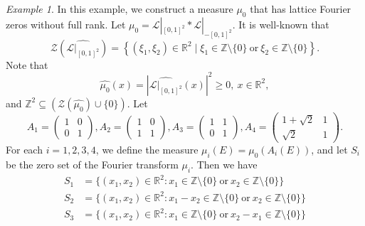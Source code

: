 \documentclass[reqno,a4paper,12pt]{amsart}
\numberwithin{equation}{section}
\newcommand{\Z}{{\mathbb Z}}
\newcounter{rem}
\theoremstyle{remark}
\newtheorem{example}{Example}[section]
\numberwithin{equation}{section}
\def\Z{\mathbb{Z}}
\begin{document}
{%

\begin{example}
 In this example, we construct a measure $\mu_0$ that has lattice Fourier zeros without full rank.    Let $\mu_0=\mathcal{L}|_{[0,1]^2}\ast \mathcal{L}|_{-[0,1]^2}$. It is well-known that 
\[
\mathcal{Z}(\widehat{\mathcal{L}|_{[0,1]^2}})=\left\{(\xi_1,\xi_2)\in\mathbb{R}^2\mid \xi_1\in \mathbb{Z}\setminus\{0\}\ \text{or}\ \xi_2\in \mathbb{Z}\setminus\{0\}\right\}.
\]
Note that \begin{equation}\label{0}
\widehat{\mu_0}(x)=|\widehat{\mathcal{L}|_{[0,1]^2}}(x)|^2\geq0,\ x\in \mathbb{R}^2,
\end{equation}
and $\mathbb{Z}^2\subseteq (\mathcal{Z}(\widehat{\mu_0})\cup\{0\})$.  Let 
\[A_1=\begin{pmatrix}
 1 &0 \\
 0 &1
\end{pmatrix},
A_2=\begin{pmatrix}
 1 &0 \\
 1 &1
\end{pmatrix},A_3=\begin{pmatrix}
 1 &1 \\
 0 &1
\end{pmatrix}
,A_4=\begin{pmatrix}
 1+\sqrt{2} &1 \\
\sqrt{2} &1
\end{pmatrix}.\]
For each $i = 1,2,3,4$, we define the measure $\mu_i(E) = \mu_0 (A_i (E))$, and let $S_i$ be the zero set of the Fourier transform $\mu_i$.  Then  we have
\begin{align}
S_1&=\{(x_1,x_2)\in \mathbb{R}^2:x_1\in \mathbb{Z}\setminus\{0\} \ \text{or}\ x_2\in \mathbb{Z}\setminus\{0\}\}\nonumber\\
S_2&=\{(x_1,x_2)\in \mathbb{R}^2:x_1-x_2\in \mathbb{Z}\setminus\{0\} \ \text{or}\ x_2\in \mathbb{Z}\setminus\{0\}\}\nonumber\\
S_3&=\{(x_1,x_2)\in \mathbb{R}^2:x_1\in \mathbb{Z}\setminus\{0\} \ \text{or}\ x_2-x_1\in \mathbb{Z}\setminus\{0\}\}\nonumber\\

\end{align}
\end{example}}
\end{document}
